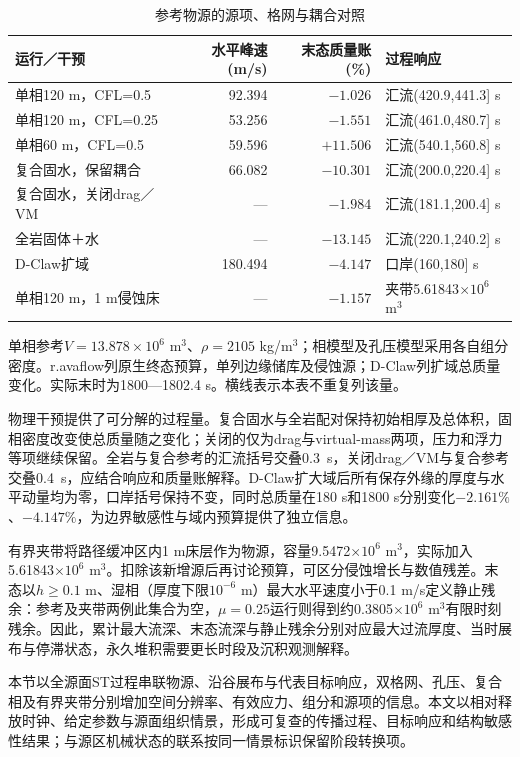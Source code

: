 \begin{table}[htbp]
\centering\small
\caption{参考物源的源项、格网与耦合对照}\label{q4-tab-numerics}
\begin{tabularx}{\linewidth}{lrrY}
\toprule
运行／干预 & 水平峰速(m/s)&末态质量账(\%)&过程响应\\
\midrule
单相120 m，CFL=0.5 &92.394&$-1.026$&汇流(420.9,441.3] s\\
单相120 m，CFL=0.25&53.256&$-1.551$&汇流(461.0,480.7] s\\
单相60 m，CFL=0.5&59.596&$+11.506$&汇流(540.1,560.8] s\\
复合固水，保留耦合&66.082&$-10.301$&汇流(200.0,220.4] s\\
复合固水，关闭drag／VM&---&$-1.984$&汇流(181.1,200.4] s\\
全岩固体＋水&---&$-13.145$&汇流(220.1,240.2] s\\
D-Claw扩域&180.494&$-4.147$&口岸(160,180] s\\
单相120 m，1 m侵蚀床&---&$-1.157$&夹带5.61843$\times10^6$ m$^3$\\
\bottomrule
\end{tabularx}
\par\raggedright\footnotesize 单相参考$V=13.878\times10^6$ m$^3$、$\rho=2105$ kg/m$^3$；相模型及孔压模型采用各自组分密度。r.avaflow列原生终态预算，单列边缘储库及侵蚀源；D-Claw列扩域总质量变化。实际末时为1800—1802.4 s。横线表示本表不重复列该量。
\end{table}

物理干预提供了可分解的过程量。复合固水与全岩配对保持初始相厚及总体积，固相密度改变使总质量随之变化；关闭的仅为drag与virtual-mass两项，压力和浮力等项继续保留。全岩与复合参考的汇流括号交叠0.3~s，关闭drag／VM与复合参考交叠0.4~s，应结合响应和质量账解释。D-Claw扩大域后所有保存外缘的厚度与水平动量均为零，口岸括号保持不变，同时总质量在180 s和1800 s分别变化$-2.161\%$、$-4.147\%$，为边界敏感性与域内预算提供了独立信息。

有界夹带将路径缓冲区内1 m床层作为物源，容量9.5472$\times10^6$ m$^3$，实际加入5.61843$\times10^6$ m$^3$。扣除该新增源后再讨论预算，可区分侵蚀增长与数值残差。末态以$h\geq0.1$ m、湿相（厚度下限$10^{-6}$ m）最大水平速度小于0.1 m/s定义静止残余：参考及夹带两例此集合为空，$\mu=0.25$运行则得到约0.3805$\times10^6$ m$^3$有限时刻残余。因此，累计最大流深、末态流深与静止残余分别对应最大过流厚度、当时展布与停滞状态，永久堆积需要更长时段及沉积观测解释。

本节以全源面ST过程串联物源、沿谷展布与代表目标响应，双格网、孔压、复合相及有界夹带分别增加空间分辨率、有效应力、组分和源项的信息。本文以相对释放时钟、给定参数与源面组织情景，形成可复查的传播过程、目标响应和结构敏感性结果；与源区机械状态的联系按同一情景标识保留阶段转换项。

\AIcredit
\FloatBarrier
